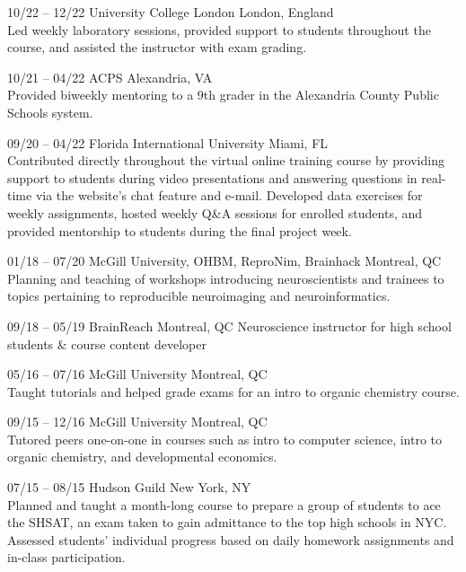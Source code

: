 \documentclass[]{friggeri-cv} %
\begin{document}
\begin{entrylist}

\entry
{10/22 -- 12/22}
{University College London}
{London, England}
{ \\
Led weekly laboratory sessions, provided support to students throughout the course, and assisted the instructor with exam grading.}

\entry
{10/21 -- 04/22}
{ACPS}
{Alexandria, VA}
{ \\
Provided biweekly mentoring to a 9th grader in the Alexandria County Public Schools system.}

\entry
{09/20 -- 04/22}
{Florida International University}
{Miami, FL}
{ \\
Contributed directly throughout the virtual online training course by providing support to students
during video presentations and answering questions in real-time via the website’s chat
feature and e-mail. Developed data exercises for weekly assignments, hosted weekly Q\&A sessions for enrolled students, 
and provided mentorship to students during the final project week.}

\entry
{01/18 -- 07/20}
{McGill University, OHBM, ReproNim, Brainhack}
{Montreal, QC}
{ \\
Planning and teaching of workshops introducing neuroscientists and trainees to
topics pertaining to reproducible neuroimaging and neuroinformatics.}

\entry
{09/18 -- 05/19}
{BrainReach}
{Montreal, QC}
{Neuroscience instructor for high school students \& course content developer}

\entry
{05/16 -- 07/16}
{McGill University}
{Montreal, QC}
{ \\
Taught tutorials and helped grade exams for an intro to organic chemistry course.
}

\entry
{09/15 -- 12/16}
{McGill University}
{Montreal, QC}
{ \\
Tutored peers one-on-one in courses such as intro to computer science, intro to organic chemistry,
and developmental economics.
}

\entry
{07/15 -- 08/15}
{Hudson Guild}
{New York, NY}
{ \\
Planned and taught a month-long course to prepare a group of students to ace the SHSAT, 
an exam taken to gain admittance to the top high schools in NYC. Assessed students'
individual progress based on daily homework assignments and in-class participation.}

\end{entrylist}
\end{document}
